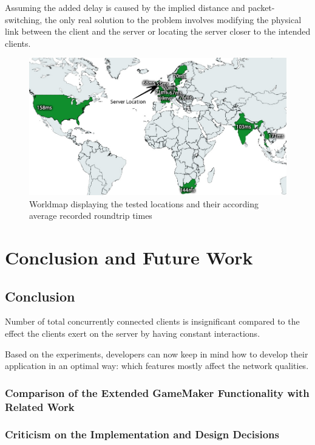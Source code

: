 \documentclass[bsc,frontabs,twoside,singlespacing,parskip,deptreport]{infthesis}     %
\begin{document}
Assuming the added delay is caused by the implied distance and packet-switching, the only real solution to the problem involves modifying the physical link between the client and the server or locating the server closer to the intended clients.

\begin{figure}
\centering
\includegraphics[scale=0.5]{images/worldmap.jpg}
\caption{Worldmap displaying the tested locations and their according average recorded roundtrip times}
\label{fig:worldmap}
\end{figure}





\chapter{Conclusion and Future Work}
\section{Conclusion}
Number of total concurrently connected clients is insignificant compared to the effect the clients exert on the server by having constant interactions.

Based on the experiments, developers can now keep in mind how to develop their application in an optimal way: which features mostly affect the network qualities.

\subsection{Comparison of the Extended GameMaker Functionality with Related Work}
\subsection{Criticism on the Implementation and Design Decisions}
\end{document}
